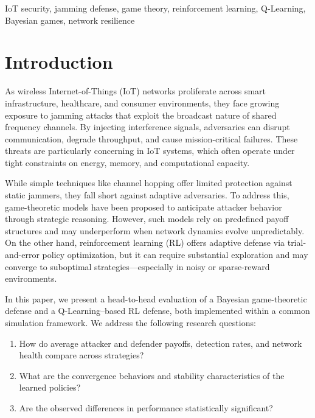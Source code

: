 \documentclass[conference]{IEEEtran}
\begin{document}
\begin{IEEEkeywords}
IoT security, jamming defense, game theory, reinforcement learning, Q-Learning, Bayesian games, network resilience
\end{IEEEkeywords}

\section{Introduction}

As wireless Internet-of-Things (IoT) networks proliferate across smart infrastructure, healthcare, and consumer environments, they face growing exposure to jamming attacks that exploit the broadcast nature of shared frequency channels. By injecting interference signals, adversaries can disrupt communication, degrade throughput, and cause mission-critical failures. These threats are particularly concerning in IoT systems, which often operate under tight constraints on energy, memory, and computational capacity.

While simple techniques like channel hopping offer limited protection against static jammers, they fall short against adaptive adversaries. To address this, game-theoretic models have been proposed to anticipate attacker behavior through strategic reasoning. However, such models rely on predefined payoff structures and may underperform when network dynamics evolve unpredictably. On the other hand, reinforcement learning (RL) offers adaptive defense via trial-and-error policy optimization, but it can require substantial exploration and may converge to suboptimal strategies—especially in noisy or sparse-reward environments.

In this paper, we present a head-to-head evaluation of a Bayesian game-theoretic defense and a Q-Learning–based RL defense, both implemented within a common simulation framework. We address the following research questions:
\begin{enumerate}
  \item How do average attacker and defender payoffs, detection rates, and network health compare across strategies?  
  \item What are the convergence behaviors and stability characteristics of the learned policies?  
  \item Are the observed differences in performance statistically significant?  
\end{enumerate}
\end{document}
